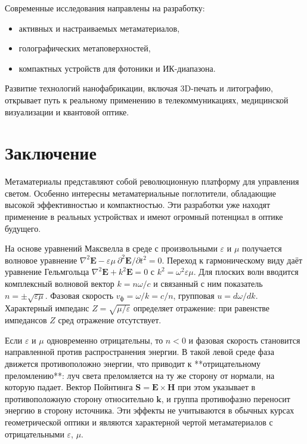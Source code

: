 \documentclass[a4paper,12pt]{article}
\begin{document}
Современные исследования направлены на разработку:
\begin{itemize}
    \item активных и настраиваемых метаматериалов,
    \item голографических метаповерхностей,
    \item компактных устройств для фотоники и ИК-диапазона.
\end{itemize}

Развитие технологий нанофабрикации, включая 3D-печать и литографию, открывает путь к реальному применению в телекоммуникациях, медицинской визуализации и квантовой оптике.

\section*{Заключение}

Метаматериалы представляют собой революционную платформу для управления светом. Особенно интересны метаматериальные поглотители, обладающие высокой эффективностью и компактностью. Эти разработки уже находят применение в реальных устройствах и имеют огромный потенциал в оптике будущего.

На основе уравнений Максвелла в среде с произвольными $\varepsilon$ и $\mu$ получается волновое уравнение $\nabla^2\mathbf{E}-\varepsilon\mu \ \partial^2\mathbf{E}/\partial t^2=0$. Переход к гармоническому виду даёт уравнение Гельмгольца $\nabla^2\mathbf{E}+k^2\mathbf{E}=0$ с $k^2=\omega^2\varepsilon\mu$. Для плоских волн вводится комплексный волновой вектор $k=n\omega/c$ и связанный с ним показатель $n=\pm\sqrt{\varepsilon\mu}$. Фазовая скорость $v_{\text{ф}}=\omega/k=c/n$, групповая $u=d\omega/dk$. Характерный импеданс $Z=\sqrt{\mu/\varepsilon}$ определяет отражение: при равенстве импедансов $Z$ сред отражение отсутствует.

Если $\varepsilon$ и $\mu$ одновременно отрицательны, то $n<0$ и фазовая скорость становится направленной против распространения энергии. В такой левой среде фаза движется противоположно энергии, что приводит к **отрицательному преломлению**: луч света преломляется на ту же сторону от нормали, на которую падает. Вектор Пойнтинга $\mathbf{S}=\mathbf{E}\times\mathbf{H}$ при этом указывает в противоположную сторону относительно $\mathbf{k}$, и группа противофазно переносит энергию в сторону источника. Эти эффекты не учитываются в обычных курсах геометрической оптики и являются характерной чертой метаматериалов с отрицательными $\varepsilon$, $\mu$.
\end{document}
